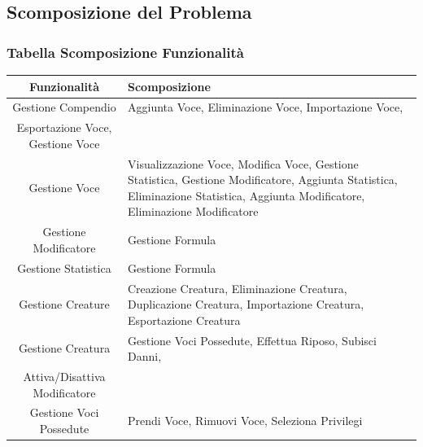 \documentclass[a4paper, 11pt]{article}
\let\newline\\
\begin{document}
\clearpage
\newpage
\subsection{Scomposizione del Problema}
\subsubsection*{Tabella Scomposizione Funzionalità}
\begin{adjustwidth}{-1cm}{-1cm}
\begin{center}
    \begin{tabular}{|c|p{11cm}|}
        \hline
        \textbf{Funzionalità} & \textbf{Scomposizione} \\\hline
        Gestione Compendio & Aggiunta Voce, Eliminazione Voce, Importazione Voce, \newline Esportazione Voce, Gestione Voce \\\hline
        Gestione Voce & Visualizzazione Voce, Modifica Voce, Gestione Statistica, Gestione Modificatore, Aggiunta Statistica, Eliminazione Statistica, Aggiunta Modificatore, Eliminazione Modificatore \\\hline
        Gestione Modificatore & Gestione Formula \\\hline
        Gestione Statistica & Gestione Formula \\\hline
        Gestione Creature & Creazione Creatura, Eliminazione Creatura, Duplicazione Creatura, Importazione Creatura, Esportazione Creatura \\\hline
        Gestione Creatura & Gestione Voci Possedute, Effettua Riposo, Subisci Danni, \newline Attiva/Disattiva Modificatore\\\hline
        Gestione Voci Possedute & Prendi Voce, Rimuovi Voce, Seleziona Privilegi \\\hline
    \end{tabular}
\end{center}
\end{adjustwidth}

\vspace{2em}
\end{document}
